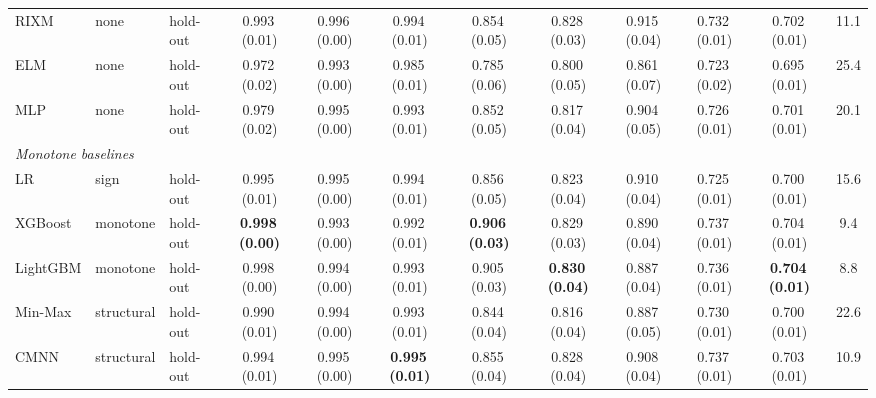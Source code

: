 \begin{table}[!tbp]
{\begin{tabular}{lllccccccccc}
RIXM & none & hold-out & 0.993\,{\scriptsize(0.01)} & 0.996\,{\scriptsize(0.00)} & 0.994\,{\scriptsize(0.01)} & 0.854\,{\scriptsize(0.05)} & 0.828\,{\scriptsize(0.03)} & 0.915\,{\scriptsize(0.04)} & 0.732\,{\scriptsize(0.01)} & 0.702\,{\scriptsize(0.01)} & 11.1 \\
ELM & none & hold-out & 0.972\,{\scriptsize(0.02)} & 0.993\,{\scriptsize(0.00)} & 0.985\,{\scriptsize(0.01)} & 0.785\,{\scriptsize(0.06)} & 0.800\,{\scriptsize(0.05)} & 0.861\,{\scriptsize(0.07)} & 0.723\,{\scriptsize(0.02)} & 0.695\,{\scriptsize(0.01)} & 25.4 \\
MLP & none & hold-out & 0.979\,{\scriptsize(0.02)} & 0.995\,{\scriptsize(0.00)} & 0.993\,{\scriptsize(0.01)} & 0.852\,{\scriptsize(0.05)} & 0.817\,{\scriptsize(0.04)} & 0.904\,{\scriptsize(0.05)} & 0.726\,{\scriptsize(0.01)} & 0.701\,{\scriptsize(0.01)} & 20.1 \\
\midrule
\multicolumn{12}{l}{\textit{Monotone baselines}} \\
LR & sign & hold-out & 0.995\,{\scriptsize(0.01)} & 0.995\,{\scriptsize(0.00)} & 0.994\,{\scriptsize(0.01)} & 0.856\,{\scriptsize(0.05)} & 0.823\,{\scriptsize(0.04)} & 0.910\,{\scriptsize(0.04)} & 0.725\,{\scriptsize(0.01)} & 0.700\,{\scriptsize(0.01)} & 15.6 \\
XGBoost & monotone & hold-out & \textbf{0.998\,{\scriptsize(0.00)}} & 0.993\,{\scriptsize(0.00)} & 0.992\,{\scriptsize(0.01)} & \textbf{0.906\,{\scriptsize(0.03)}} & 0.829\,{\scriptsize(0.03)} & 0.890\,{\scriptsize(0.04)} & 0.737\,{\scriptsize(0.01)} & 0.704\,{\scriptsize(0.01)} & 9.4 \\
LightGBM & monotone & hold-out & 0.998\,{\scriptsize(0.00)} & 0.994\,{\scriptsize(0.00)} & 0.993\,{\scriptsize(0.01)} & 0.905\,{\scriptsize(0.03)} & \textbf{0.830\,{\scriptsize(0.04)}} & 0.887\,{\scriptsize(0.04)} & 0.736\,{\scriptsize(0.01)} & \textbf{0.704\,{\scriptsize(0.01)}} & 8.8 \\
Min-Max & structural & hold-out & 0.990\,{\scriptsize(0.01)} & 0.994\,{\scriptsize(0.00)} & 0.993\,{\scriptsize(0.01)} & 0.844\,{\scriptsize(0.04)} & 0.816\,{\scriptsize(0.04)} & 0.887\,{\scriptsize(0.05)} & 0.730\,{\scriptsize(0.01)} & 0.700\,{\scriptsize(0.01)} & 22.6 \\
CMNN & structural & hold-out & 0.994\,{\scriptsize(0.01)} & 0.995\,{\scriptsize(0.00)} & \textbf{0.995\,{\scriptsize(0.01)}} & 0.855\,{\scriptsize(0.04)} & 0.828\,{\scriptsize(0.04)} & 0.908\,{\scriptsize(0.04)} & 0.737\,{\scriptsize(0.01)} & 0.703\,{\scriptsize(0.01)} & 10.9 \\

\end{tabular}}
\end{table}

